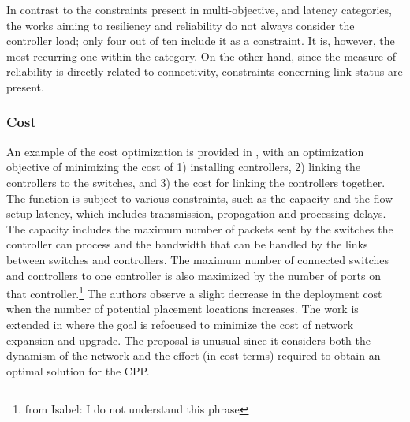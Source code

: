 \documentclass{IEEEtran}
\newcommand\fia[1]{{\color{red}\footnote{\color{red}from Isabel: #1}}} %
\newcommand\mia[1]{{\color{red}#1}}%
\newcommand\delia[1]{{\tiny{\color{red}#1}}} %
\begin{document}
In contrast to the constraints present in multi-objective, and latency categories, the works aiming to resiliency and reliability do not always consider the controller load; only four out of ten include it as a constraint. It is, however, the most recurring one within the category. On the other hand, since the measure of reliability is directly related to connectivity, constraints concerning link status are present.


\subsubsection{Cost}
An example of the cost optimization is provided in \cite{SaSt15}, with an optimization objective of minimizing the cost of 1) installing controllers, 2) linking the controllers to the switches, and 3) the cost for linking the controllers together. The function is subject to various constraints, such as \delia{the} capacity and \delia{the} flow-setup latency, which includes transmission, propagation and processing delays. The capacity includes the maximum number of packets sent by the switches the controller can process and the bandwidth that can be handled by the links between switches and controllers. The maximum number of connected switches and controllers to one controller is also maximized by the number of ports on that controller.\fia{I do not understand this phrase} The authors observe a slight decrease in the deployment cost when the number of potential placement locations increases. The work is extended in \cite{SaHi17} where the goal is refocus\mia{ed} to minimize the cost of network expansion and upgrade. The proposal is unusual since it considers both the dynamism of the network and the effort (in cost terms) required to obtain an optimal solution for the CPP.
\end{document}
